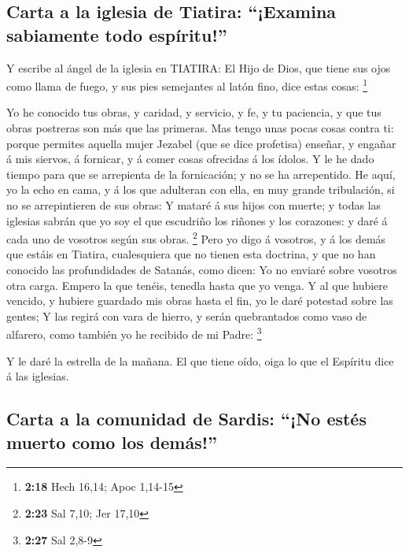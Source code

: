 \hypertarget{carta-a-la-iglesia-de-tiatira-examina-sabiamente-todo-espuxedritu}{%
\subsection{Carta a la iglesia de Tiatira: ``¡Examina sabiamente todo
espíritu!''}\label{carta-a-la-iglesia-de-tiatira-examina-sabiamente-todo-espuxedritu}}

 Y escribe al ángel de la iglesia en TIATIRA: El Hijo de
Dios, que tiene sus ojos como llama de fuego, y sus pies semejantes al
latón fino, dice estas cosas: \footnote{\textbf{2:18} Hech 16,14; Apoc
  1,14-15}

 Yo he conocido tus obras, y caridad, y servicio, y fe, y
tu paciencia, y que tus obras postreras son más que las primeras.
 Mas tengo unas pocas cosas contra ti: porque permites
aquella mujer Jezabel (que se dice profetisa) enseñar, y engañar á mis
siervos, á fornicar, y á comer cosas ofrecidas á los ídolos.
 Y le he dado tiempo para que se arrepienta de la
fornicación; y no se ha arrepentido.  He aquí, yo la echo
en cama, y á los que adulteran con ella, en muy grande tribulación, si
no se arrepintieren de sus obras:  Y mataré á sus hijos con
muerte; y todas las iglesias sabrán que yo soy el que escudriño los
riñones y los corazones: y daré á cada uno de vosotros según sus obras.
\footnote{\textbf{2:23} Sal 7,10; Jer 17,10}  Pero yo digo
á vosotros, y á los demás que estáis en Tiatira, cualesquiera que no
tienen esta doctrina, y que no han conocido las profundidades de
Satanás, como dicen: Yo no enviaré sobre vosotros otra carga.
 Empero la que tenéis, tenedla hasta que yo venga.
 Y al que hubiere vencido, y hubiere guardado mis obras
hasta el fin, yo le daré potestad sobre las gentes;  Y las
regirá con vara de hierro, y serán quebrantados como vaso de alfarero,
como también yo he recibido de mi Padre: \footnote{\textbf{2:27} Sal
  2,8-9}

 Y le daré la estrella de la mañana.  El que
tiene oído, oiga lo que el Espíritu dice á las iglesias.

\hypertarget{carta-a-la-comunidad-de-sardis-no-estuxe9s-muerto-como-los-demuxe1s}{%
\subsection{Carta a la comunidad de Sardis: ``¡No estés muerto como los
demás!''}\label{carta-a-la-comunidad-de-sardis-no-estuxe9s-muerto-como-los-demuxe1s}}

